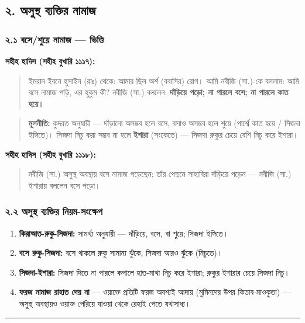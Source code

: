 \subsection*{২. অসুস্থ ব্যক্তির নামাজ}

\subsubsection*{২.১ বসে/শুয়ে নামাজ — ভিত্তি}

\textbf{সহীহ হাদিস (সহীহ বুখারি ১১১৭):}

\begin{quote}
ইমরান ইবনে হুসাইন (রাঃ) থেকে: আমার ছিল অর্শ (ববাসির) রোগ। আমি নবীজি (সা.)-কে বললাম: আমি বসে নামাজ পড়ি, এর হুকুম কী? নবীজি (সা.) বললেন: \textbf{দাঁড়িয়ে পড়ো; না পারলে বসে; না পারলে কাত হয়ে।}
\end{quote}

\begin{quote}
\textbf{মূলনীতি:} কুদরত অনুযায়ী — দাঁড়ানো অসম্ভব হলে বসে, বসাও অসম্ভব হলে শুয়ে (পার্শ্বে কাত হয়ে / সিজদা ইঙ্গিতে)। সিজদা নিচু করা সম্ভব না হলে \textbf{ইশারা} (সংকেতে) — সিজদা রুকুর চেয়ে বেশি নিচু করে ইশারা।
\end{quote}

\textbf{সহীহ হাদিস (সহীহ বুখারি ১১১৮):}

\begin{quote}
নবীজি (সা.) অসুস্থ অবস্থায় বসে নামাজ পড়েছেন; তাঁর পেছনে সাহাবিরা দাঁড়িয়ে পড়েন — নবীজি (সা.) ইশারায় বললেন বসে পড়ো।
\end{quote}

\subsubsection*{২.২ অসুস্থ ব্যক্তির নিয়ম-সংক্ষেপ}

\begin{enumerate}
\item \textbf{কিরাআত-রুকু-সিজদা:} সামর্থ্য অনুযায়ী — দাঁড়িয়ে, বসে, বা শুয়ে; সিজদা ইঙ্গিতে।
\item \textbf{বসে রুকু-সিজদা:} বসে থাকলে রুকু সামান্য ঝুঁকে, সিজদা আরও ঝুঁকে (নিচুতে)।
\item \textbf{সিজদা-ইশারা:} সিজদা দিতে না পারলে কপালে হাত-মাথা নিচু করে ইশারা; রুকুর ইশারার চেয়ে সিজদা নিচু।
\item \textbf{ফরজ নামাজ রাহাত দেয় না} — ওয়াক্তে প্রতিটি ফরজ অবশ্যই আদায় (মুমিনদের উপর কিতাব-মাওকুতা) — অসুস্থ অবস্থায়ও ওয়াক্ত পেরিয়ে যাওয়া থেকে রেহাই পেতে যথাসাধ্য।
\end{enumerate}
\medskip\hrule\medskip

